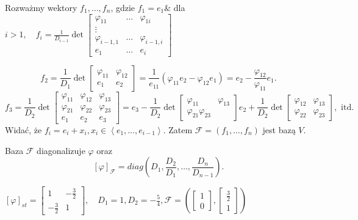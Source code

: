 \documentclass[../main.tex]{subfiles}
\begin{document}
    Rozważmy wektory $f_1,\ldots,f_n$, gdzie $f_1 = e_1 \&$ dla $i>1,\quad f_i = \frac{1}{D_{i-1}} \det \begin{bmatrix} \varphi_{11}&\ldots&\varphi_{1i}\\ \vdots \\ \varphi_{i-1, 1}&\ldots&\varphi_{i-1, i}\\ e_1& \ldots& e_i \end{bmatrix}$
    \begin{przyklad}
        \[
            f_2 = \frac{1}{D_1} \det \begin{bmatrix} \varphi_{11}&\varphi_{12}\\e_1&e_2 \end{bmatrix} = \frac{1}{e_{11}}(\varphi_{11}e_2 - \varphi_{12}e_1) = e_2 - \frac{\varphi_{12}}{\varphi_{11}}e_1
        .\]
        \[
            f_3 = \frac{1}{D_2} \det \begin{bmatrix} \varphi_{11}&\varphi_{12}&\varphi_{13}\\\varphi_{21}&\varphi_{22}&\varphi_{23}\\e_1&e_2&e_3 \end{bmatrix} = e_3 - \frac{1}{D_2} \det \begin{bmatrix} \varphi_{11}&\varphi_{13}\\\varphi_{21}\varphi_{23} \end{bmatrix} e_2 + \frac{1}{D_2}\det \begin{bmatrix} \varphi_{12}&\varphi_{13}\\\varphi_{22}&\varphi_{23} \end{bmatrix}, \text{ itd.}
        \]
    Widać, że $f_i = e_i + x_i, x_i\in \left< e_1,\ldots,e_{i-1}\right>$. Zatem $\mathcal{F} = \left( f_1,\ldots,f_n \right) $ jest bazą $V$.
    \end{przyklad}
    \begin{tw}
        Baza $\mathcal{F}$ diagonalizuje $\varphi$ oraz
        \[
         \left[ \varphi \right] _\mathcal{F} = diag \left( D_1, \frac{D_2}{D_1},\ldots, \frac{D_n}{D_{n-1}} \right)
        .\]
    \end{tw}
    \begin{przyklad}
        $\left[ \varphi \right] _{st} = \begin{bmatrix} 1&-\frac{3}{2}\\ -\frac{3}{2}&1 \end{bmatrix} ,\quad D_1 = 1, D_2 = -\frac{5}{4}, \mathcal{F} = \left( \begin{bmatrix} 1\\0 \end{bmatrix} , \begin{bmatrix} \frac{3}{2}\\1 \end{bmatrix}  \right) $
    \end{przyklad}
\end{document}

